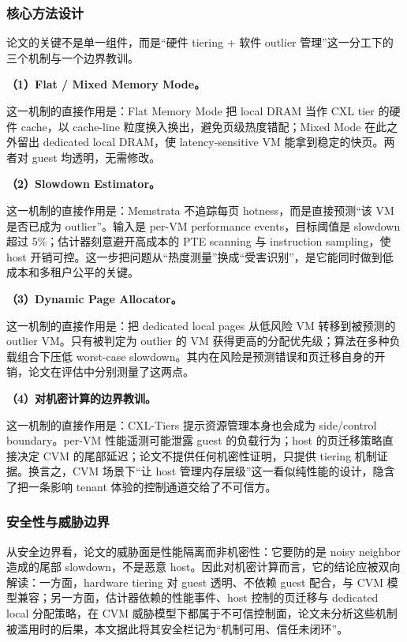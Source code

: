 \documentclass[11pt]{ctexart}
\begin{document}
\subsubsection{核心方法设计}
论文的关键不是单一组件，而是“硬件 tiering + 软件 outlier 管理”这一分工下的三个机制与一个边界教训。\par
\noindent\textbf{（1）Flat / Mixed Memory Mode。}\par
这一机制的直接作用是：Flat Memory Mode 把 local DRAM 当作 CXL tier 的硬件 cache，以 cache-line 粒度换入换出，避免页级热度错配；Mixed Mode 在此之外留出 dedicated local DRAM，使 latency-sensitive VM 能拿到稳定的快页。两者对 guest 均透明，无需修改。\par
\noindent\textbf{（2）Slowdown Estimator。}\par
这一机制的直接作用是：Memstrata 不追踪每页 hotness，而是直接预测“该 VM 是否已成为 outlier”。输入是 per-VM performance events，目标阈值是 slowdown 超过 5\%；估计器刻意避开高成本的 PTE scanning 与 instruction sampling，使 host 开销可控。这一步把问题从“热度测量”换成“受害识别”，是它能同时做到低成本和多租户公平的关键。\par
\noindent\textbf{（3）Dynamic Page Allocator。}\par
这一机制的直接作用是：把 dedicated local pages 从低风险 VM 转移到被预测的 outlier VM。只有被判定为 outlier 的 VM 获得更高的分配优先级；算法在多种负载组合下压低 worst-case slowdown。其内在风险是预测错误和页迁移自身的开销，论文在评估中分别测量了这两点。\par
\noindent\textbf{（4）对机密计算的边界教训。}\par
这一机制的直接作用是：CXL-Tiers 提示资源管理本身也会成为 side/control boundary。per-VM 性能遥测可能泄露 guest 的负载行为；host 的页迁移策略直接决定 CVM 的尾部延迟；论文不提供任何机密性证明，只提供 tiering 机制证据。换言之，CVM 场景下“让 host 管理内存层级”这一看似纯性能的设计，隐含了把一条影响 tenant 体验的控制通道交给了不可信方。\par
\subsubsection{安全性与威胁边界}
从安全边界看，论文的威胁面是性能隔离而非机密性：它要防的是 noisy neighbor 造成的尾部 slowdown，不是恶意 host。因此对机密计算而言，它的结论应被双向解读：一方面，hardware tiering 对 guest 透明、不依赖 guest 配合，与 CVM 模型兼容；另一方面，估计器依赖的性能事件、host 控制的页迁移与 dedicated local 分配策略，在 CVM 威胁模型下都属于不可信控制面，论文未分析这些机制被滥用时的后果，本文据此将其安全栏记为“机制可用、信任未闭环”。\par
\end{document}
